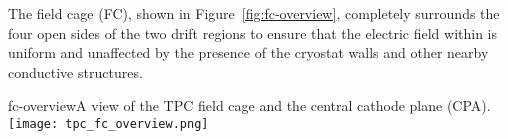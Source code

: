 The field cage (FC), shown in Figure~\ref{fig:fc-overview}, completely surrounds the four
open sides of the two drift regions to ensure that the electric field within is uniform and unaffected by the presence of the cryostat walls and other nearby conductive structures.

\begin{cdrfigure}{fc-overview}{A view of the TPC field cage and the central cathode plane (CPA).}
\texttt{[image: tpc\_fc\_overview.png]}
\end{cdrfigure}













